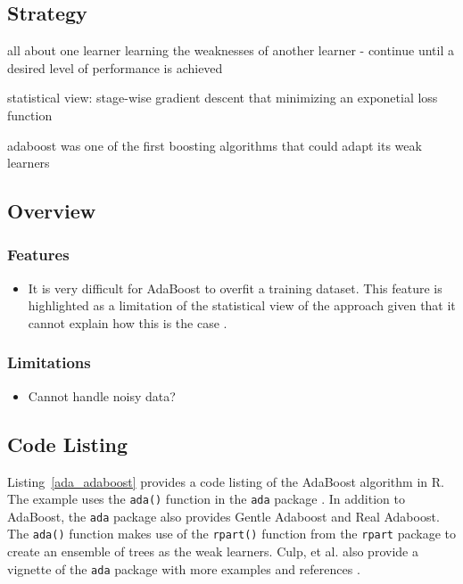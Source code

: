 \subsection{Strategy}

all about one learner learning the weaknesses of another learner - continue until a desired level of performance is achieved

statistical view: stage-wise gradient descent that minimizing an exponetial loss function

adaboost was one of the first boosting algorithms that could adapt its weak learners


\subsection{Overview}

\subsubsection{Features}

\begin{itemize}
	\item It is very difficult for AdaBoost to overfit a training dataset. This feature is highlighted as a limitation of the statistical view of the approach given that it cannot explain how this is the case \cite{Mease2008}.
\end{itemize}

\subsubsection{Limitations}

\begin{itemize}
	\item Cannot handle noisy data? \cite{Long2010}
\end{itemize}


\subsection{Code Listing}
Listing~\ref{ada_adaboost} provides a code listing of the AdaBoost algorithm in R.
The example uses the \texttt{ada()} function in the \texttt{ada} package \cite{Culp2007}. In addition to AdaBoost, the \texttt{ada} package also provides Gentle Adaboost and Real Adaboost. The \texttt{ada()} function makes use of the \texttt{rpart()} function from the \texttt{rpart} package to create an ensemble of trees as the weak learners.
Culp, et al. also provide a vignette of the \texttt{ada} package with more examples and references \cite{Culp2006}.

